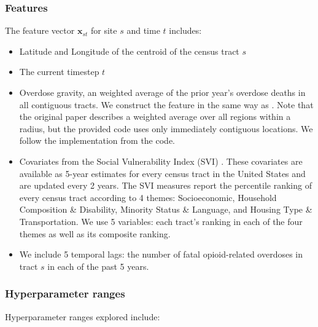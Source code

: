 \subsubsection{Features}
\label{supp:features_opioids}

The feature vector $\bm{x}_{st}$ for site $s$ and time $t$ includes:
\begin{itemize}
    \item Latitude and Longitude of the centroid of the census tract $s$
    \item The current timestep $t$
    \item Overdose gravity, an weighted average of the prior year's overdose deaths in all contiguous tracts. We construct the feature in the same way as \cite{marks_identifying_2021}. Note that the original paper describes a weighted average over all regions within a radius, but the provided code uses only immediately contiguous locations. We follow the implementation from the code. 
    \item Covariates from the Social Vulnerability Index (SVI) \cite{cdcatsdrCDCATSDRSocial2022}. These covariates are available as 5-year estimates for every census tract in the United States and are updated every 2 years. The SVI measures report the percentile ranking of every census tract according to 4 themes: Socioeconomic, Household Composition \& Disability, Minority Status \& Language, and Housing Type \& Transportation. We use 5 variables: each tract's ranking in each of the four themes as well as its composite ranking.
    \item We include 5 temporal lags: the number of fatal opioid-related overdoses in tract $s$ in each of the past 5 years.
\end{itemize}

\subsubsection{Hyperparameter ranges}


Hyperparameter ranges explored include:

